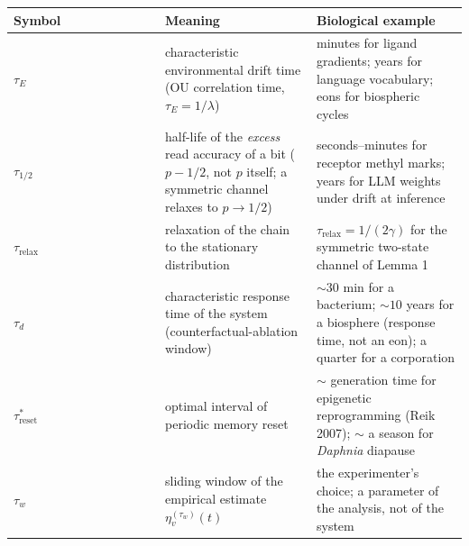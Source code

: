 \documentclass[pdflatex,sn-mathphys-ay]{sn-jnl}
\begin{document}
\begin{center}\small
\begin{tabular}{@{} >{\raggedright\arraybackslash}p{0.3333\linewidth} >{\raggedright\arraybackslash}p{0.3333\linewidth} >{\raggedright\arraybackslash}p{0.3333\linewidth}@{}}
\toprule

\begin{minipage}[b]{\linewidth}\raggedright

Symbol

\end{minipage} & \begin{minipage}[b]{\linewidth}\raggedright

Meaning

\end{minipage} & \begin{minipage}[b]{\linewidth}\raggedright

Biological example

\end{minipage} \\

\midrule

\(\tau_E\) & characteristic environmental drift time (OU correlation time, \(\tau_E = 1/\lambda\)) & minutes for ligand gradients; years for language vocabulary; eons for biospheric cycles \\

\(\tau_{1/2}\) & half-life of the \emph{excess} read accuracy of a bit (\(p - 1/2\), not \(p\) itself; a symmetric channel relaxes to \(p \to 1/2\)) & seconds--minutes for receptor methyl marks; years for LLM weights under drift at inference \\

\(\tau_{\text{relax}}\) & relaxation of the chain to the stationary distribution & \(\tau_{\text{relax}} = 1/(2\gamma)\) for the symmetric two-state channel of Lemma 1 \\

\(\tau_d\) & characteristic response time of the system (counterfactual-ablation window) & \(\sim 30\) min for a bacterium; \(\sim 10\) years for a biosphere (response time, not an eon); a quarter for a corporation \\

\(\tau_{\text{reset}}^*\) & optimal interval of periodic memory reset & \(\sim\) generation time for epigenetic reprogramming (Reik 2007); \(\sim\) a season for \emph{Daphnia} diapause \\

\(\tau_w\) & sliding window of the empirical estimate \(\eta_v^{(\tau_w)}(t)\) & the experimenter's choice; a parameter of the analysis, not of the system \\

\bottomrule
\end{tabular}
\end{center}
\end{document}
